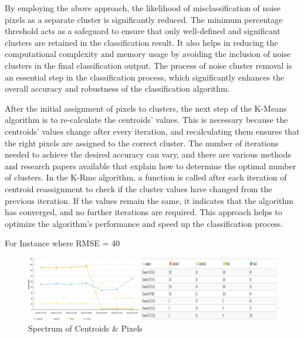 \documentclass{article}
\begin{document}
{                    By employing the above approach, the likelihood of misclassification of noise pixels as a separate cluster is significantly reduced. The minimum percentage threshold acts as a safeguard to ensure that only well-defined and significant clusters are retained in the classification result. It also helps in reducing the computational complexity and memory usage by avoiding the inclusion of noise clusters in the final classification output. The process of noise cluster removal is an essential step in the classification process, which significantly enhances the overall accuracy and robustness of the classification algorithm.\par
                    After the initial assignment of pixels to clusters, the next step of the K-Means algorithm is to re-calculate the centroids' values. This is necessary because the centroids' values change after every iteration, and recalculating them ensures that the right pixels are assigned to the correct cluster. The number of iterations needed to achieve the desired accuracy can vary, and there are various methods and research papers available that explain how to determine the optimal number of clusters.
                    In the K-Rms algorithm, a function is called after each iteration of centroid reassignment to check if the cluster values have changed from the previous iteration. If the values remain the same, it indicates that the algorithm has converged, and no further iterations are required. This approach helps to optimize the algorithm's performance and speed up the classification process.\par
                    
                    For Instance where RMSE = 40
                    
                    
                    \begin{figure}[h]
                        \centering
                        \includegraphics[width=1\textwidth]{Figures/SpectraChannels.PNG}
                        \caption{Spectrum of Centroids \& Pixels}
                        \label{fig:my_label}
                    \end{figure}
                    
}
\end{document}
